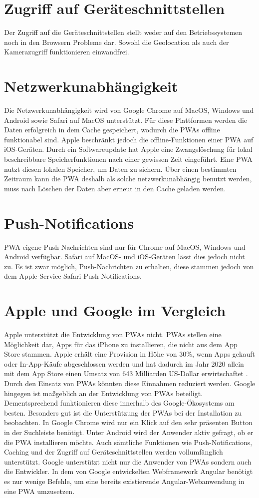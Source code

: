 \section{Zugriff auf Geräteschnittstellen}
Der Zugriff auf die Geräteschnittstellen stellt weder auf den Betriebssystemen noch in den Browsern Probleme dar. Sowohl die Geolocation als auch der Kamerazugriff funktionieren einwandfrei.

\section{Netzwerkunabhängigkeit}
Die Netzwerkunabhängigkeit wird von Google Chrome auf MacOS, Windows und Android sowie Safari auf MacOS unterstützt. Für diese Plattformen werden die Daten erfolgreich in dem Cache gespeichert, wodurch die PWAs offline funktionabel sind.
Apple beschränkt jedoch die offline-Funktionen einer PWA auf iOS-Geräten. Durch ein Softwareupdate hat Apple eine Zwangslöschung für lokal beschreibbare Speicherfunktionen nach einer gewissen Zeit eingeführt. Eine PWA nutzt diesen lokalen Speicher, um Daten zu sichern. Über einen bestimmten Zeitraum kann die PWA deshalb als solche netzwerkunabhängig benutzt werden, muss nach Löschen der Daten aber erneut in den Cache geladen werden.

\section{Push-Notifications}
PWA-eigene Push-Nachrichten sind nur für Chrome auf MacOS, Windows und Android verfügbar. Safari auf MacOS- und iOS-Geräten lässt dies jedoch nicht zu. Es ist zwar möglich, Push-Nachrichten zu erhalten, diese stammen jedoch von dem Apple-Service Safari Push Notifications. 

\section{Apple und Google im Vergleich}
Apple unterstützt die Entwicklung von PWAs nicht. PWAs stellen eine Möglichkeit dar, Apps für das iPhone zu installieren, die nicht aus dem App Store stammen. Apple erhält eine Provision in Höhe von 30\%, wenn Apps gekauft oder In-App-Käufe abgeschlossen werden und hat dadurch im Jahr 2020 allein mit dem App Store einen Umsatz von 643 Milliarden US-Dollar erwirtschaftet \cite{Kirchenbauer2021}. Durch den Einsatz von PWAs könnten diese Einnahmen reduziert werden.
Google hingegen ist maßgeblich an der Entwicklung von PWAs beteiligt. Dementsprechend funktionieren diese innerhalb des Google-Ökosystems am besten. Besonders gut ist die Unterstützung der PWAs bei der Installation zu beobachten. In Google Chrome wird nur ein Klick auf den sehr präsenten Button in der Suchleiste benötigt. Unter Android wird der Anwender aktiv gefragt, ob er die PWA installieren möchte. Auch sämtliche Funktionen wie Push-Notifications, Caching und der Zugriff auf Geräteschnittstellen werden vollumfänglich unterstützt.
Google unterstützt nicht nur die Anwender von PWAs sondern auch die Entwickler. In dem von Google entwickelten Webframework Angular benötigt es nur wenige Befehle, um eine bereits existierende Angular-Webanwendung in eine PWA umzusetzen. 



